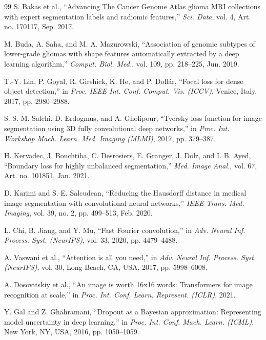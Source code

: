 \documentclass[conference]{IEEEtran}
\begin{document}
\begin{thebibliography}{99}
S. Bakas et al., ``Advancing The Cancer Genome Atlas glioma MRI collections with expert segmentation labels and radiomic features,'' \textit{Sci. Data}, vol. 4, Art. no. 170117, Sep. 2017.

M. Buda, A. Saha, and M. A. Mazurowski, ``Association of genomic subtypes of lower-grade gliomas with shape features automatically extracted by a deep learning algorithm,'' \textit{Comput. Biol. Med.}, vol. 109, pp. 218--225, Jun. 2019.

T.-Y. Lin, P. Goyal, R. Girshick, K. He, and P. Doll\'{a}r, ``Focal loss for dense object detection,'' in \textit{Proc. IEEE Int. Conf. Comput. Vis. (ICCV)}, Venice, Italy, 2017, pp. 2980--2988.

S. S. M. Salehi, D. Erdogmus, and A. Gholipour, ``Tversky loss function for image segmentation using 3D fully convolutional deep networks,'' in \textit{Proc. Int. Workshop Mach. Learn. Med. Imaging (MLMI)}, 2017, pp. 379--387.

H. Kervadec, J. Bouchtiba, C. Desrosiers, E. Granger, J. Dolz, and I. B. Ayed, ``Boundary loss for highly unbalanced segmentation,'' \textit{Med. Image Anal.}, vol. 67, Art. no. 101851, Jan. 2021.

D. Karimi and S. E. Salcudean, ``Reducing the Hausdorff distance in medical image segmentation with convolutional neural networks,'' \textit{IEEE Trans. Med. Imaging}, vol. 39, no. 2, pp. 499--513, Feb. 2020.

L. Chi, B. Jiang, and Y. Mu, ``Fast Fourier convolution,'' in \textit{Adv. Neural Inf. Process. Syst. (NeurIPS)}, vol. 33, 2020, pp. 4479--4488.

A. Vaswani et al., ``Attention is all you need,'' in \textit{Adv. Neural Inf. Process. Syst. (NeurIPS)}, vol. 30, Long Beach, CA, USA, 2017, pp. 5998--6008.

A. Dosovitskiy et al., ``An image is worth 16x16 words: Transformers for image recognition at scale,'' in \textit{Proc. Int. Conf. Learn. Represent. (ICLR)}, 2021.

Y. Gal and Z. Ghahramani, ``Dropout as a Bayesian approximation: Representing model uncertainty in deep learning,'' in \textit{Proc. Int. Conf. Mach. Learn. (ICML)}, New York, NY, USA, 2016, pp. 1050--1059.


\end{thebibliography}
\end{document}
